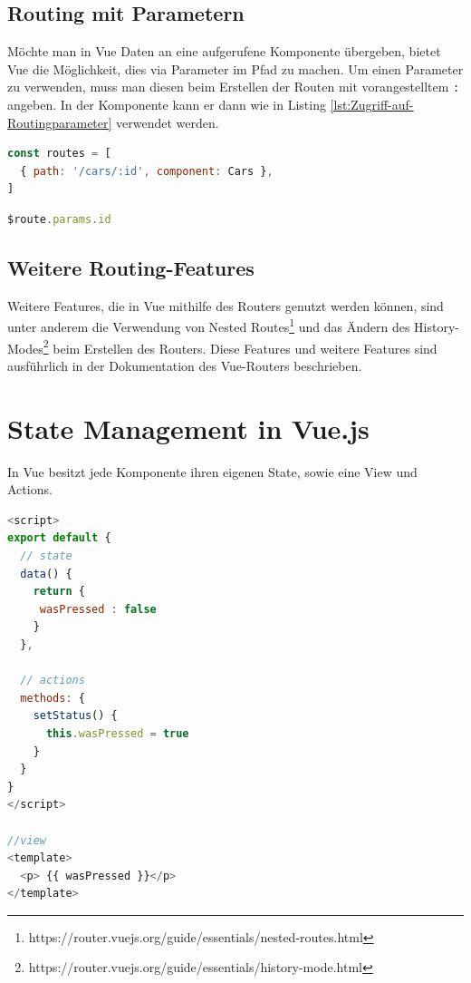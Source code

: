 \subsection*{Routing mit Parametern}
Möchte man in Vue Daten an eine aufgerufene Komponente übergeben, bietet Vue die Möglichkeit,
dies via Parameter im Pfad zu machen.
Um einen Parameter zu verwenden, muss man diesen beim Erstellen der Routen mit vorangestelltem \lstinline{:} angeben.
In der Komponente kann er dann wie in Listing \ref{lst:Zugriff-auf-Routingparameter} verwendet werden. \cite{vueRouterDynamicRouteMatching}
\begin{lstlisting}[caption={Route mit Parameter},language=javascript,label={lst:Route-mit-Parameter}]
const routes = [
  { path: '/cars/:id', component: Cars },
]
\end{lstlisting}

\begin{lstlisting}[caption={Zugriff auf Routingparameter},language=javascript,label={lst:Zugriff-auf-Routingparameter}]
$route.params.id
\end{lstlisting}

\subsection*{Weitere Routing-Features}
Weitere Features, die in Vue mithilfe des Routers genutzt werden können,
sind unter anderem die Verwendung von Nested Routes\footnote{https://router.vuejs.org/guide/essentials/nested-routes.html}
und das Ändern des History-Modes\footnote{https://router.vuejs.org/guide/essentials/history-mode.html} beim Erstellen des Routers.
Diese Features und weitere Features sind ausführlich in der Dokumentation des Vue-Routers beschrieben.

\section{State Management in Vue.js}
In Vue besitzt jede Komponente ihren eigenen State, sowie eine View und Actions.
\begin{lstlisting}[caption={State, View und Actions},language=javascript,label={lst:State-View-und-Actions}]
<script>
export default {
  // state
  data() {
    return {
     wasPressed : false
    }
  },

  // actions
  methods: {
    setStatus() {
      this.wasPressed = true
    }
  }
}
</script>

//view
<template>
  <p> {{ wasPressed }}</p>
</template>
\end{lstlisting}

